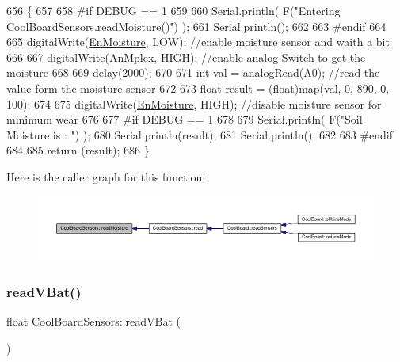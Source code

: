 \begin{DoxyCode}
656 \{
657 
658 \textcolor{preprocessor}{#if DEBUG == 1}
659     
660     Serial.println( F(\textcolor{stringliteral}{"Entering CoolBoardSensors.readMoisture()"}) );
661     Serial.println();
662     
663 \textcolor{preprocessor}{#endif}
664 
665     digitalWrite(\hyperlink{classCoolBoardSensors_a6177d02e14a057a2f171a2e930b5038d}{EnMoisture}, LOW);                 \textcolor{comment}{//enable moisture sensor and waith a bit}
666 
667     digitalWrite(\hyperlink{classCoolBoardSensors_a12ef28b1046219e0aee10bf64e28c4a5}{AnMplex}, HIGH);         \textcolor{comment}{//enable analog Switch to get the moisture}
668 
669     delay(2000);
670 
671     \textcolor{keywordtype}{int} val = analogRead(A0);                       \textcolor{comment}{//read the value form the moisture sensor}
672 
673     \textcolor{keywordtype}{float} result = (float)map(val, 0, 890, 0, 100); 
674 
675     digitalWrite(\hyperlink{classCoolBoardSensors_a6177d02e14a057a2f171a2e930b5038d}{EnMoisture}, HIGH);                  \textcolor{comment}{//disable moisture sensor for minimum wear}
676     
677 \textcolor{preprocessor}{#if DEBUG == 1 }
678 
679     Serial.println( F(\textcolor{stringliteral}{"Soil Moisture is : "}) );
680     Serial.println(result);
681     Serial.println();
682 
683 \textcolor{preprocessor}{#endif }
684 
685     \textcolor{keywordflow}{return} (result);
686 \}
\end{DoxyCode}
Here is the caller graph for this function\+:\nopagebreak
\begin{figure}[H]
\begin{center}
\leavevmode
\includegraphics[width=350pt]{classCoolBoardSensors_a8761bff50373c485f4465c8db47d0633_icgraph}
\end{center}
\end{figure}
\mbox{\label{classCoolBoardSensors_a6944b6ea7bce8e2fce1b434acfd9d5f3}} 
\subsubsection{\texorpdfstring{read\+V\+Bat()}{readVBat()}}
{\footnotesize\ttfamily float Cool\+Board\+Sensors\+::read\+V\+Bat (\begin{DoxyParamCaption}{ }\end{DoxyParamCaption})}

